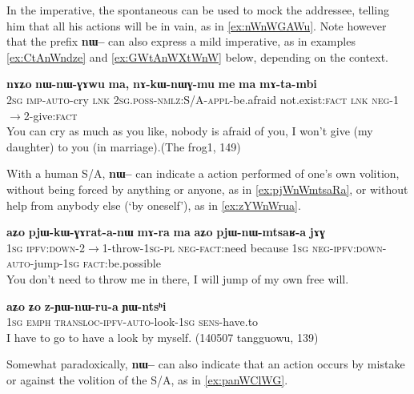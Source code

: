 \documentclass[oldfontcommands,oneside,a4paper,11pt]{article}
\newcommand{\ipa}[1]{\textbf{{\phon\mbox{#1}}}} %
\begin{document}
In the imperative, the spontaneous can be used to mock the addressee, telling him that all his actions will be in vain, as in \ref{ex:nWnWGAWu}. Note however that the prefix \ipa{nɯ--} can also express a mild imperative, as in examples \ref{ex:CtAnWndze} and \ref{ex:GWtAnWXtWnW} below, depending on the context.

\begin{exe}
\ex \label{ex:nWnWGAWu}
\gll 
\ipa{nɤʑo} 	\ipa{nɯ-nɯ-ɣɤwu} 	\ipa{ma,} 	\ipa{nɤ-kɯ-nɯɣ-mu} 	\ipa{me} 	\ipa{ma} 	\ipa{mɤ-ta-mbi} \\
\textsc{2sg} \textsc{imp-auto}-cry \textsc{lnk} \textsc{2sg.poss-nmlz}:S/A-\textsc{appl}-be.afraid not.exist:\textsc{fact} \textsc{lnk} \textsc{neg}-1$\rightarrow$2-give:\textsc{fact} \\
\glt You can cry as much as you like, nobody is afraid of you, I won't give (my daughter) to you (in marriage).(The frog1, 149)
\end{exe}

With a human S/A, \ipa{nɯ--} can indicate a action performed of one's own volition, without being forced by anything or anyone, as in \ref{ex:pjWnWmtsaRa}, or without help from anybody else (`by oneself'), as in \ref{ex:zYWnWrua}.

\begin{exe}
\ex \label{ex:pjWnWmtsaRa}
\gll 
\ipa{aʑo} 	\ipa{pjɯ-kɯ-ɣɤrat-a-nɯ} 	\ipa{mɤ-ra} 	\ipa{ma} 	\ipa{aʑo} 	\ipa{pjɯ-nɯ-mtsaʁ-a} 	\ipa{jɤɣ} \\
\textsc{1sg} \textsc{ipfv:down}-2$\rightarrow$1-throw-\textsc{1sg-pl} \textsc{neg-fact}:need because \textsc{1sg} \textsc{neg-ipfv:down-auto}-jump-\textsc{1sg} \textsc{fact}:be.possible \\
\glt You don't need to throw me in there, I will jump of my own free will.
\end{exe}



\begin{exe}
\ex \label{ex:zYWnWrua}
\gll
\ipa{aʑo} 	\ipa{ʑo} 	\ipa{z-ɲɯ-nɯ-ru-a} 	\ipa{ɲɯ-ntsʰi} \\
\textsc{1sg} \textsc{emph} \textsc{transloc-ipfv-auto}-look-\textsc{1sg} \textsc{sens}-have.to \\
\glt I have to go to have a look by myself. (140507 tangguowu, 139)
\end{exe} 



Somewhat paradoxically, \ipa{nɯ--} can also indicate that an action occurs by mistake or against the volition of the S/A, as in \ref{ex:panWClWG}.
\end{document}
